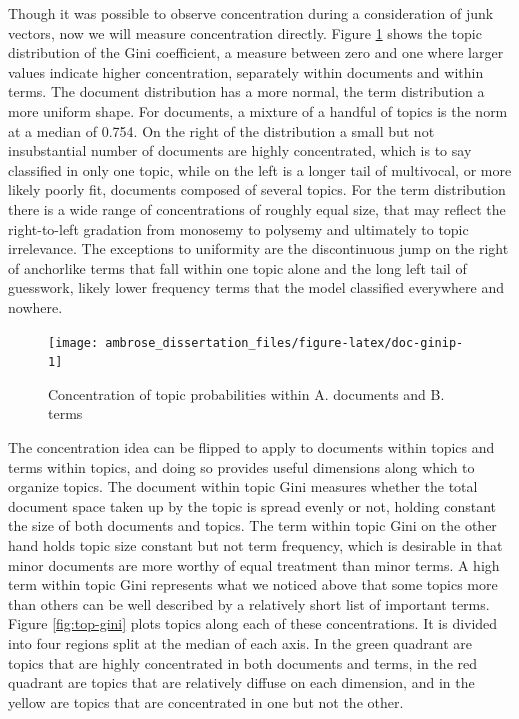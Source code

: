 \documentclass[]{book}
\theoremstyle{definition}
\theoremstyle{definition}
\theoremstyle{definition}
\theoremstyle{remark}
\begin{document}
Though it was possible to observe concentration during a consideration
of junk vectors, now we will measure concentration directly. Figure
\ref{fig:doc-ginip} shows the topic distribution of the Gini
coefficient, a measure between zero and one where larger values indicate
higher concentration, separately within documents and within terms. The
document distribution has a more normal, the term distribution a more
uniform shape. For documents, a mixture of a handful of topics is the
norm at a median of 0.754. On the right of the distribution a small but
not insubstantial number of documents are highly concentrated, which is
to say classified in only one topic, while on the left is a longer tail
of multivocal, or more likely poorly fit, documents composed of several
topics. For the term distribution there is a wide range of
concentrations of roughly equal size, that may reflect the right-to-left
gradation from monosemy to polysemy and ultimately to topic irrelevance.
The exceptions to uniformity are the discontinuous jump on the right of
anchorlike terms that fall within one topic alone and the long left tail
of guesswork, likely lower frequency terms that the model classified
everywhere and nowhere.

\begin{figure}

{\centering \texttt{[image: ambrose\_dissertation\_files/figure-latex/doc-ginip-1]} 

}

\caption{Concentration of topic probabilities within A. documents and B. terms}\label{fig:doc-ginip}
\end{figure}

The concentration idea can be flipped to apply to documents within
topics and terms within topics, and doing so provides useful dimensions
along which to organize topics. The document within topic Gini measures
whether the total document space taken up by the topic is spread evenly
or not, holding constant the size of both documents and topics. The term
within topic Gini on the other hand holds topic size constant but not
term frequency, which is desirable in that minor documents are more
worthy of equal treatment than minor terms. A high term within topic
Gini represents what we noticed above that some topics more than others
can be well described by a relatively short list of important terms.
Figure \ref{fig:top-gini} plots topics along each of these
concentrations. It is divided into four regions split at the median of
each axis. In the green quadrant are topics that are highly concentrated
in both documents and terms, in the red quadrant are topics that are
relatively diffuse on each dimension, and in the yellow are topics that
are concentrated in one but not the other.
\end{document}

